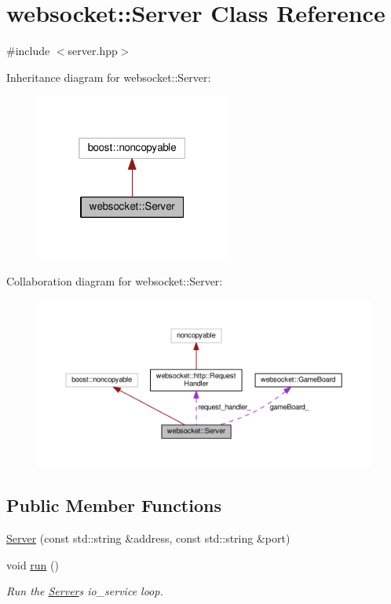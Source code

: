 \hypertarget{classwebsocket_1_1Server}{}\section{websocket\+:\+:Server Class Reference}
\label{classwebsocket_1_1Server}


{\ttfamily \#include $<$server.\+hpp$>$}



Inheritance diagram for websocket\+:\+:Server\+:
\nopagebreak
\begin{figure}[H]
\begin{center}
\leavevmode
\includegraphics[width=181pt]{classwebsocket_1_1Server__inherit__graph}
\end{center}
\end{figure}


Collaboration diagram for websocket\+:\+:Server\+:
\nopagebreak
\begin{figure}[H]
\begin{center}
\leavevmode
\includegraphics[width=350pt]{classwebsocket_1_1Server__coll__graph}
\end{center}
\end{figure}
\subsection*{Public Member Functions}
\begin{DoxyCompactItemize}
\item 
\hyperlink{classwebsocket_1_1Server_a5a619eb7cc286a2288794f0488441a43}{Server} (const std\+::string \&address, const std\+::string \&port)
\item 
void \hyperlink{classwebsocket_1_1Server_afbc99df156a68d67b6a8ecc82e0b7a57}{run} ()
\begin{DoxyCompactList}\small\item\em Run the \hyperlink{classwebsocket_1_1Server}{Server}\textquotesingle{}s io\+\_\+service loop. \end{DoxyCompactList}\end{DoxyCompactItemize}
